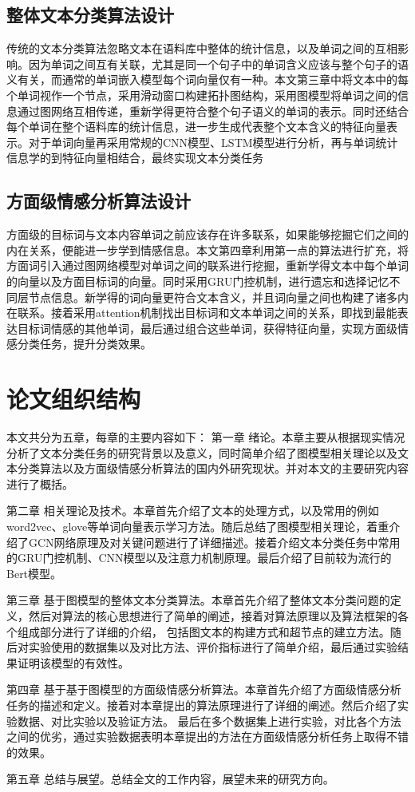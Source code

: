 \subsection{整体文本分类算法设计}
传统的文本分类算法忽略文本在语料库中整体的统计信息，以及单词之间的互相影响。因为单词之间互有关联，尤其是同一个句子中的单词含义应该与整个句子的语义有关，而通常的单词嵌入模型每个词向量仅有一种。本文第三章中将文本中的每个单词视作一个节点，采用滑动窗口构建拓扑图结构，采用图模型将单词之间的信息通过图网络互相传递，重新学得更符合整个句子语义的单词的表示。同时还结合每个单词在整个语料库的统计信息，进一步生成代表整个文本含义的特征向量表示。对于单词向量再采用常规的CNN模型、LSTM模型进行分析，再与单词统计信息学的到特征向量相结合，最终实现文本分类任务
\subsection{方面级情感分析算法设计}
方面级的目标词与文本内容单词之前应该存在许多联系，如果能够挖掘它们之间的内在关系，便能进一步学到情感信息。本文第四章利用第一点的算法进行扩充，将方面词引入通过图网络模型对单词之间的联系进行挖掘，重新学得文本中每个单词的向量以及方面目标词的向量。同时采用GRU门控机制，进行遗忘和选择记忆不同层节点信息。新学得的词向量更符合文本含义，并且词向量之间也构建了诸多内在联系。接着采用attention机制找出目标词和文本单词之间的关系，即找到最能表达目标词情感的其他单词，最后通过组合这些单词，获得特征向量，实现方面级情感分类任务，提升分类效果。
\section{论文组织结构}
本文共分为五章，每章的主要内容如下：
第一章 绪论。本章主要从根据现实情况分析了文本分类任务的研究背景以及意义，同时简单介绍了图模型相关理论以及文本分类算法以及方面级情感分析算法的国内外研究现状。并对本文的主要研究内容进行了概括。

第二章 相关理论及技术。本章首先介绍了文本的处理方式，以及常用的例如word2vec、glove等单词向量表示学习方法。随后总结了图模型相关理论，着重介绍了GCN网络原理及对关键问题进行了详细描述。接着介绍文本分类任务中常用的GRU门控机制、CNN模型以及注意力机制原理。最后介绍了目前较为流行的Bert模型。

第三章 基于图模型的整体文本分类算法。本章首先介绍了整体文本分类问题的定义，然后对算法的核心思想进行了简单的阐述，接着对算法原理以及算法框架的各个组成部分进行了详细的介绍，
包括图文本的构建方式和超节点的建立方法。随后对实验使用的数据集以及对比方法、评价指标进行了简单介绍，最后通过实验结果证明该模型的有效性。

第四章 基于基于图模型的方面级情感分析算法。本章首先介绍了方面级情感分析任务的描述和定义。接着对本章提出的算法原理进行了详细的阐述。然后介绍了实验数据、对比实验以及验证方法。
最后在多个数据集上进行实验，对比各个方法之间的优劣，通过实验数据表明本章提出的方法在方面级情感分析任务上取得不错的效果。

第五章 总结与展望。总结全文的工作内容，展望未来的研究方向。 
